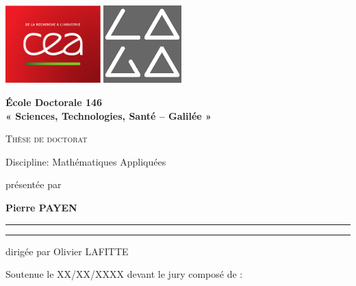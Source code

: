 \hypersetup{pageanchor=false}
\thispagestyle{empty}
\begin{titlepage}
\includegraphics[height = 3cm]{images/logo/CEA.pdf}
\hfill
\includegraphics[height = 3cm]{images/logo/laga.jpg}

\begin{center}
{\Large \textbf{École Doctorale 146 \\« Sciences, Technologies, Santé – Galilée »}}


{\Huge \textsc{Thèse de doctorat}}


{\LARGE Discipline: Mathématiques Appliquées}


{\large présentée par}

{
    \textbf{{\LARGE Pierre PAYEN}}\\
}

\hrule
{}
{\LARGE \textbf{\doctitlefr}}
\hrule

{\Large
dirigée par Olivier LAFITTE}


{\Large Soutenue le XX/XX/XXXX devant le jury composé de :}


\end{center}
\end{titlepage}
